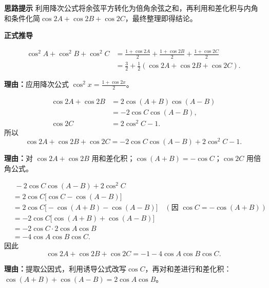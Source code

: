 \begin{proofbox}
\textbf{\textcolor{CProof}{思路提示}}
利用降次公式将余弦平方转化为倍角余弦之和，再利用和差化积与内角和条件化简$\cos 2A+\cos 2B+\cos 2C$，最终整理即得结论。

\medskip
\textbf{\textcolor{CProof}{正式推导}}
\begin{description}[style=nextline, leftmargin=2.8em, labelsep=0.5em, itemsep=0.55em]
    \item[\textbf{步骤一（降次展开）：}] 
    \[
    \begin{aligned}
    \cos^2 A+\cos^2 B+\cos^2 C 
    &= \frac{1+\cos 2A}{2} + \frac{1+\cos 2B}{2} + \frac{1+\cos 2C}{2}\\
    &= \frac{3}{2} + \frac{1}{2}(\cos 2A+\cos 2B+\cos 2C).
    \end{aligned}
    \]
    \par\textbf{理由：}应用降次公式 $\cos^2 x = \frac{1+\cos 2x}{2}$。

    \item[\textbf{步骤二（和差化积）：}] 
    \[
    \begin{aligned}
    \cos 2A+\cos 2B &= 2\cos(A+B)\cos(A-B)\\
    &= -2\cos C\cos(A-B),\\
    \cos 2C &= 2\cos^2 C - 1.
    \end{aligned}
    \]
    所以
    \[
    \cos 2A+\cos 2B+\cos 2C = -2\cos C\cos(A-B) + 2\cos^2 C - 1.
    \]
    \par\textbf{理由：}对 $\cos 2A+\cos 2B$ 用和差化积；$\cos(A+B)=-\cos C$；$\cos 2C$ 用倍角公式。

    \item[\textbf{步骤三（合并化简）：}] 
    \[
    \begin{aligned}
    &\; -2\cos C\cos(A-B) + 2\cos^2 C\\ 
    &= 2\cos C\bigl[\cos C - \cos(A-B)\bigr]\\
    &= 2\cos C\bigl[-\cos(A+B) - \cos(A-B)\bigr] \quad (\text{因 }\cos C = -\cos(A+B))\\
    &= -2\cos C\bigl[\cos(A+B)+\cos(A-B)\bigr]\\
    &= -2\cos C\cdot 2\cos A\cos B\\
    &= -4\cos A\cos B\cos C.
    \end{aligned}
    \]
    因此
    \[
    \cos 2A+\cos 2B+\cos 2C = -1 - 4\cos A\cos B\cos C.
    \]
    \par\textbf{理由：}提取公因式，利用诱导公式改写$\cos C$，再对和差进行和差化积：$\cos(A+B)+\cos(A-B)=2\cos A\cos B$。


\end{description}
\end{proofbox}
